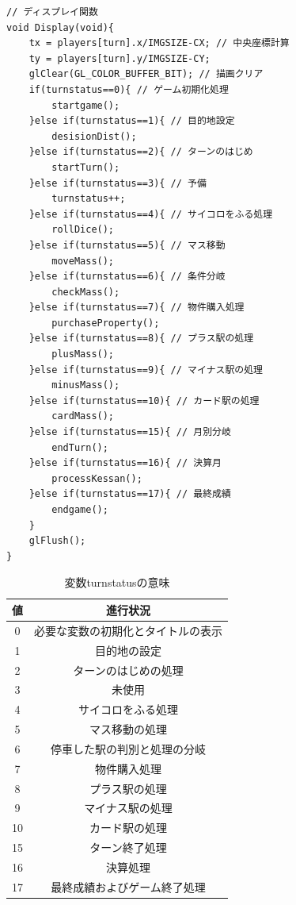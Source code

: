 \documentclass[a4j]{jarticle}
\begin{document}
\begin{lstlisting}[basicstyle=\ttfamily\footnotesize, frame=single,label=Display,caption=Display関数]
// ディスプレイ関数
void Display(void){
    tx = players[turn].x/IMGSIZE-CX; // 中央座標計算
    ty = players[turn].y/IMGSIZE-CY;
    glClear(GL_COLOR_BUFFER_BIT); // 描画クリア
    if(turnstatus==0){ // ゲーム初期化処理
        startgame();
    }else if(turnstatus==1){ // 目的地設定
        desisionDist();
    }else if(turnstatus==2){ // ターンのはじめ
        startTurn();
    }else if(turnstatus==3){ // 予備
        turnstatus++;
    }else if(turnstatus==4){ // サイコロをふる処理
        rollDice();
    }else if(turnstatus==5){ // マス移動
        moveMass();
    }else if(turnstatus==6){ // 条件分岐
        checkMass();
    }else if(turnstatus==7){ // 物件購入処理
        purchaseProperty();
    }else if(turnstatus==8){ // プラス駅の処理
        plusMass();
    }else if(turnstatus==9){ // マイナス駅の処理
        minusMass();
    }else if(turnstatus==10){ // カード駅の処理
        cardMass();
    }else if(turnstatus==15){ // 月別分岐
        endTurn();
    }else if(turnstatus==16){ // 決算月
        processKessan();
    }else if(turnstatus==17){ // 最終成績
        endgame();
    }
    glFlush();
}
    \end{lstlisting} 

    \begin{table}[H]
  \caption{変数turnstatusの意味}
\label{turnstatus}
\begin{center}
    \begin{tabular}{c|c}\hline
    値 & 進行状況 \\ \hline \hline
    0 & 必要な変数の初期化とタイトルの表示 \\ 
    1 & 目的地の設定 \\
    2 & ターンのはじめの処理 \\
    3 & 未使用 \\
    4 & サイコロをふる処理 \\
    5 & マス移動の処理 \\
    6 & 停車した駅の判別と処理の分岐 \\
    7 & 物件購入処理 \\
    8 & プラス駅の処理 \\
    9 & マイナス駅の処理 \\
    10 & カード駅の処理 \\
    15 & ターン終了処理 \\
    16 & 決算処理 \\
    17 & 最終成績およびゲーム終了処理 \\ \hline
    \end{tabular}
\end{center}
\end{table}
\end{document}

